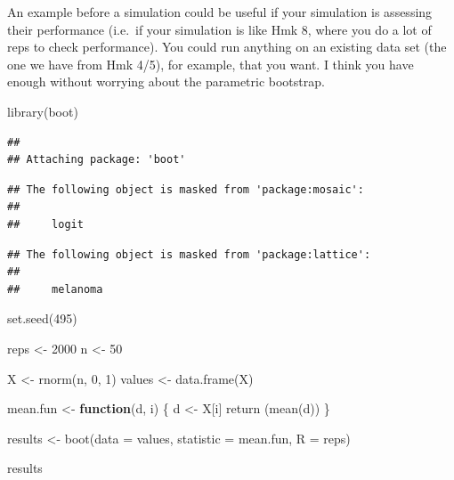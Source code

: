 \documentclass[12pt]{article}
\newenvironment{Shaded}{\begin{snugshade}}{\end{snugshade}}
\newcommand{\AttributeTok}[1]{\textcolor[rgb]{0.77,0.63,0.00}{#1}}
\newcommand{\ControlFlowTok}[1]{\textcolor[rgb]{0.13,0.29,0.53}{\textbf{#1}}}
\newcommand{\DecValTok}[1]{\textcolor[rgb]{0.00,0.00,0.81}{#1}}
\newcommand{\FunctionTok}[1]{\textcolor[rgb]{0.00,0.00,0.00}{#1}}
\newcommand{\NormalTok}[1]{#1}
\newcommand{\OtherTok}[1]{\textcolor[rgb]{0.56,0.35,0.01}{#1}}
\begin{document}
An example before a simulation could be useful if your simulation is
assessing their performance (i.e.~if your simulation is like Hmk 8,
where you do a lot of reps to check performance). You could run anything
on an existing data set (the one we have from Hmk 4/5), for example,
that you want. I think you have enough without worrying about the
parametric bootstrap.

\begin{Shaded}
\begin{Highlighting}[]
\FunctionTok{library}\NormalTok{(boot)}
\end{Highlighting}
\end{Shaded}

\begin{verbatim}
## 
## Attaching package: 'boot'
\end{verbatim}

\begin{verbatim}
## The following object is masked from 'package:mosaic':
## 
##     logit
\end{verbatim}

\begin{verbatim}
## The following object is masked from 'package:lattice':
## 
##     melanoma
\end{verbatim}

\begin{Shaded}
\begin{Highlighting}[]
\FunctionTok{set.seed}\NormalTok{(}\DecValTok{495}\NormalTok{)}

\NormalTok{reps }\OtherTok{\textless{}{-}} \DecValTok{2000}
\NormalTok{n }\OtherTok{\textless{}{-}} \DecValTok{50}

\NormalTok{X }\OtherTok{\textless{}{-}} \FunctionTok{rnorm}\NormalTok{(n, }\DecValTok{0}\NormalTok{, }\DecValTok{1}\NormalTok{)}
\NormalTok{values }\OtherTok{\textless{}{-}} \FunctionTok{data.frame}\NormalTok{(X)}

\NormalTok{mean.fun }\OtherTok{\textless{}{-}} \ControlFlowTok{function}\NormalTok{(d, i) \{}
\NormalTok{  d }\OtherTok{\textless{}{-}}\NormalTok{ X[i]}
  \FunctionTok{return}\NormalTok{ (}\FunctionTok{mean}\NormalTok{(d))}
\NormalTok{\}}

\NormalTok{results }\OtherTok{\textless{}{-}} \FunctionTok{boot}\NormalTok{(}\AttributeTok{data =}\NormalTok{ values, }\AttributeTok{statistic =}\NormalTok{ mean.fun, }\AttributeTok{R =}\NormalTok{ reps)}

\NormalTok{results}
\end{Highlighting}
\end{Shaded}
\end{document}
